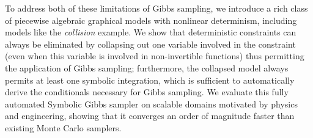 To address both of these limitations of Gibbs sampling, we introduce a
rich class of piecewise algebraic graphical models with nonlinear
determinism, including models like the \emph{collision} example.  We
show that deterministic constraints can always be eliminated by
collapsing out one variable involved in the constraint (even when this
variable is involved in non-invertible functions) thus permitting the
application of Gibbs sampling; furthermore, the collapsed model always
permits at least one symbolic integration, which is sufficient to
automatically derive the conditionals necessary for Gibbs sampling.
We evaluate this fully automated Symbolic Gibbs sampler on scalable
domains motivated by physics and engineering, showing that it
converges an order of magnitude faster than existing Monte Carlo
samplers.

